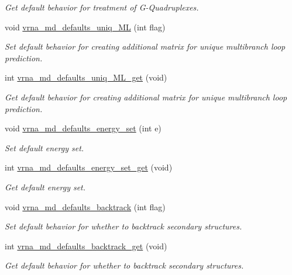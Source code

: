 \begin{DoxyCompactItemize}
\begin{DoxyCompactList}\small\item\em Get default behavior for treatment of G-\/\-Quadruplexes. \end{DoxyCompactList}\item 
void \hyperlink{group__model__details_ga59b944f61c5d2babec2d4c48c820de67}{vrna\-\_\-md\-\_\-defaults\-\_\-uniq\-\_\-\-M\-L} (int flag)
\begin{DoxyCompactList}\small\item\em Set default behavior for creating additional matrix for unique multibranch loop prediction. \end{DoxyCompactList}\item 
int \hyperlink{group__model__details_gab48e70fd024bf838404bcbcca0c874a0}{vrna\-\_\-md\-\_\-defaults\-\_\-uniq\-\_\-\-M\-L\-\_\-get} (void)
\begin{DoxyCompactList}\small\item\em Get default behavior for creating additional matrix for unique multibranch loop prediction. \end{DoxyCompactList}\item 
void \hyperlink{group__model__details_ga8dd29c55787a4576277e1907e92d810c}{vrna\-\_\-md\-\_\-defaults\-\_\-energy\-\_\-set} (int e)
\begin{DoxyCompactList}\small\item\em Set default energy set. \end{DoxyCompactList}\item 
int \hyperlink{group__model__details_ga017ed6afb1cba2b7f242412cab618b53}{vrna\-\_\-md\-\_\-defaults\-\_\-energy\-\_\-set\-\_\-get} (void)
\begin{DoxyCompactList}\small\item\em Get default energy set. \end{DoxyCompactList}\item 
void \hyperlink{group__model__details_ga978c468b2fe96a70d5191e3dd17d5599}{vrna\-\_\-md\-\_\-defaults\-\_\-backtrack} (int flag)
\begin{DoxyCompactList}\small\item\em Set default behavior for whether to backtrack secondary structures. \end{DoxyCompactList}\item 
int \hyperlink{group__model__details_ga90da1156e6883ddd68527c2830706648}{vrna\-\_\-md\-\_\-defaults\-\_\-backtrack\-\_\-get} (void)
\begin{DoxyCompactList}\small\item\em Get default behavior for whether to backtrack secondary structures. \end{DoxyCompactList}\item 

\end{DoxyCompactItemize}
